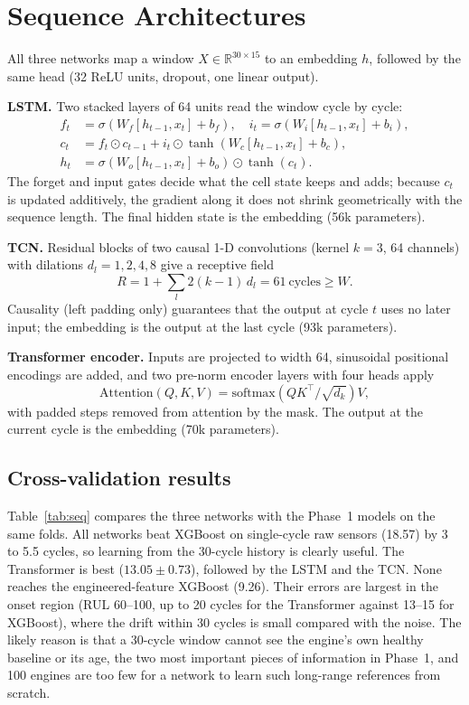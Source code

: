 \section{Sequence Architectures}\label{sec:arch}
All three networks map a window $X\in\mathbb{R}^{30\times 15}$ to an embedding $h$, followed by the same head (32 ReLU units, dropout, one linear output).

\textbf{LSTM.} Two stacked layers of 64 units read the window cycle by cycle:
\begin{equation}
\begin{aligned}
f_t&=\sigma(W_f[h_{t-1},x_t]+b_f),\quad i_t=\sigma(W_i[h_{t-1},x_t]+b_i),\\
c_t&=f_t\odot c_{t-1}+i_t\odot\tanh(W_c[h_{t-1},x_t]+b_c),\\
h_t&=\sigma(W_o[h_{t-1},x_t]+b_o)\odot\tanh(c_t).
\end{aligned}
\end{equation}
The forget and input gates decide what the cell state keeps and adds; because $c_t$ is updated additively, the gradient along it does not shrink geometrically with the sequence length. The final hidden state is the embedding (56k parameters).

\textbf{TCN.} Residual blocks of two causal 1-D convolutions (kernel $k=3$, 64 channels) with dilations $d_l=1,2,4,8$ give a receptive field
\begin{equation}
R=1+\sum_l 2(k-1)\,d_l=61\ \text{cycles}\geq W.
\end{equation}
Causality (left padding only) guarantees that the output at cycle $t$ uses no later input; the embedding is the output at the last cycle (93k parameters).

\textbf{Transformer encoder.} Inputs are projected to width 64, sinusoidal positional encodings are added, and two pre-norm encoder layers with four heads apply
\begin{equation}
\mathrm{Attention}(Q,K,V)=\mathrm{softmax}\!\left(QK^\top/\sqrt{d_k}\right)V,
\end{equation}
with padded steps removed from attention by the mask. The output at the current cycle is the embedding (70k parameters).

\subsection{Cross-validation results}
Table~\ref{tab:seq} compares the three networks with the Phase~1 models on the same folds. All networks beat XGBoost on single-cycle raw sensors (18.57) by 3 to 5.5 cycles, so learning from the 30-cycle history is clearly useful. The Transformer is best ($13.05\pm0.73$), followed by the LSTM and the TCN. None reaches the engineered-feature XGBoost (9.26). Their errors are largest in the onset region (RUL 60--100, up to 20 cycles for the Transformer against 13--15 for XGBoost), where the drift within 30 cycles is small compared with the noise. The likely reason is that a 30-cycle window cannot see the engine's own healthy baseline or its age, the two most important pieces of information in Phase~1, and 100 engines are too few for a network to learn such long-range references from scratch.

